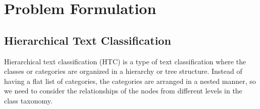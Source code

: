 \section{Problem Formulation}




\subsection{Hierarchical Text Classification}
Hierarchical text classification (HTC) is a type of text classification where the classes or categories are organized in a hierarchy or tree structure. Instead of having a flat list of categories, the categories are arranged in a nested manner, so we need to consider the relationships of the nodes from different levels in the class taxonomy. 

